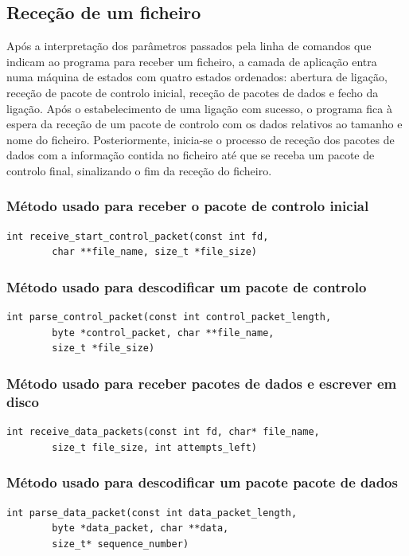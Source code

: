 \documentclass[a4paper,11pt,titlepage]{article}
\begin{document}
\subsection{Receção de um ficheiro}

Após a interpretação dos parâmetros passados pela linha de comandos que indicam ao programa para receber um ficheiro, a camada de aplicação entra numa máquina de estados com quatro estados ordenados: abertura de ligação, receção de pacote de controlo inicial, receção de pacotes de dados e fecho da ligação. Após o estabelecimento de uma ligação com sucesso, o programa fica à espera da receção de um pacote de controlo com os dados relativos ao tamanho e nome do ficheiro. Posteriormente, inicia-se o processo de receção dos pacotes de dados com a informação contida no ficheiro até que se receba um pacote de controlo final, sinalizando o fim da receção do ficheiro.

\subsubsection*{Método usado para receber o pacote de controlo inicial}
\begin{lstlisting}[style=customc]
int receive_start_control_packet(const int fd,
		char **file_name, size_t *file_size)
\end{lstlisting}

\subsubsection*{Método usado para descodificar um pacote de controlo}
\begin{lstlisting}[style=customc]
int parse_control_packet(const int control_packet_length,
		byte *control_packet, char **file_name,
		size_t *file_size)
\end{lstlisting}

\subsubsection*{Método usado para receber pacotes de dados e escrever em disco}
\begin{lstlisting}[style=customc]
int receive_data_packets(const int fd, char* file_name, 
		size_t file_size, int attempts_left)
\end{lstlisting}

\subsubsection*{Método usado para descodificar um pacote pacote de dados}
\begin{lstlisting}[style=customc]
int parse_data_packet(const int data_packet_length,
		byte *data_packet, char **data,
		size_t* sequence_number)
\end{lstlisting}
\end{document}

